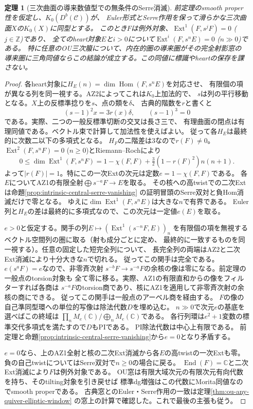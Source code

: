 \documentclass[11pt,a4paper]{ltjsarticle}
\newtheorem{theorem}{定理}[section]
\theoremstyle{definition}
\begin{document}
\begin{theorem}[三次曲面の導来数値型での無条件のSerre消滅]
\label{thm:ou-numerical-serre-vanishing}
前定理のsmooth proper性を仮定し、$K_0(D^b(\mathcal C))$が、
Euler形式とSerre作用を保って滑らかな三次曲面$X$の$K_0(X)$に同型とする。
このとき$F$は例外対象、$\operatorname{Ext}^1(F,s^jF)=0$ ($j\in\mathbb Z$)であり、
全てのheart対象$E$と$i>0$について$\operatorname{Ext}^i(F,s^nE)=0$ ($n\gg0$)である。
特に任意のOU三次箙について、内在的圏の導来圏がその完全射影窓の
導来圏に三角同値ならこの結論が成立する。この同値に標識やheartの保存を課さない。
\end{theorem}
\begin{proof}
各heart対象に$H_E(n)=\dim\operatorname{Hom}(F,s^nE)$を対応させ、
有限個の項が異なる列を同一視する。AZ2によってこれは$K_0$上加法的で、
$s$は列の平行移動となる。$X$上の反標準捻りを$s$、点の類を$\delta$、
古典的階数を$r$と書くと
\[
 (s-1)^2 x=3r(x)\delta,\qquad (s-1)^3=0
\]
である。実際、二つの一般反標準切断の交叉は長さ三で、
有理曲面の閉点は有理同値である。ベクトル束で計算して加法性を使えばよい。
従って各$H_E$は最終的に次数二以下の多項式となる。
$H_F$の二階差は$3$なので$r(F)\ne0$。
$\operatorname{Ext}^2(F,s^nF)=0$ ($n\ge0$)とRiemann--Rochにより
\[
 0\le \dim\operatorname{Ext}^1(F,s^nF)
 =1-\chi(F,F)+\tfrac32(1-r(F)^2)n(n+1).
\]
よって$|r(F)|=1$。特にこの一次Extの次元は定数$e=1-\chi(F,F)$である。
各$E$についてAZ1の有限全射$\bigoplus s^{-a}F\to E$を取る。
その核への高twistでの二次Extは命題\ref{prop:intrinsic-central-serre-vanishing}
の証明冒頭のSerre双対と負Hom消滅だけで零となる。
ゆえに$\dim\operatorname{Ext}^1(F,s^nE)$は大きな$n$で有界である。
Euler列と$H_E$の差は最終的に多項式なので、この次元は一定値$e(E)$を取る。

$e>0$と仮定する。関手の列$E\mapsto(\operatorname{Ext}^1(s^{-n}F,E))_n$
を有限個の項を無視するベクトル空間列の圏に取る（射も成分ごとに定め、
最終的に一致するものを同一視する）。任意の固定した短完全列について、
長完全列の両端はAZ2と二次Ext消滅により十分大きな$n$で切れる。
従ってこの関手は完全である。$e(s^aF)=e$なので、非零斉次射
$s^{-b}F\to s^{-a}F$の余核の像は零になる。前定理の一般点のtorsion対象も
全て零に移る。実際、AZ1の有限直和からの像をフィルターすれば各商は
$s^{-a}F$のtorsion商であり、核にAZ1を適用して非零斉次射の余核の商にできる。
従ってこの関手は一般点のアーベル商を経由する。
$F$の像の自己準同型環への単位的写像は除法代数$D$を埋め込む。
$n\gg0$で次元$e$の基底を選べばこの終域は
$\prod_n M_e(\mathbb C)/\bigoplus_n M_e(\mathbb C)$である。
各行列環は$e^2+1$変数の標準交代多項式を満たすので$D$もPIである。
PI除法代数は中心上有限である\cite[Theorem~4.1]{BresarPI}。
前定理と命題\ref{prop:intrinsic-central-serre-vanishing}から$e=0$となり矛盾する。

$e=0$なら、上のAZ1全射と核の二次Ext消滅から各$E$の高twistの一次Extも零。
負の自己twistについてはSerre双対で$n\ge0$の場合に戻る。
$\operatorname{End}(F)=\mathbb C$と二次Ext消滅により$F$は例外対象である。
OU窓は有限大域次元の有限次元有向代数を持ち、そのtilting対象を引き戻せば
標準dg増強はこの代数にMorita同値なのでsmooth properである。
古典窓とのEuler・Serre作用の一致は定理\ref{thm:ou-any-quiver-elliptic-window}
の窓上の計算で確認した。これで最後の主張も従う。
\end{proof}
\end{document}
